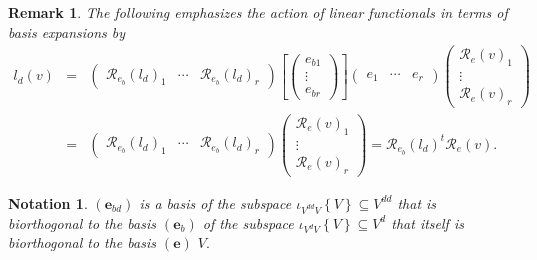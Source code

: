 \documentclass[aps,preprint]{revtex4}
\newtheorem{notation}[theorem]{Notation}
\newtheorem{remark}[theorem]{Remark}
\begin{document}
\begin{remark}
The following emphasizes the action of linear functionals in terms of basis
expansions by 
\begin{eqnarray}
l_{d}\left( v\right) &=&\left( 
\begin{array}{ccc}
\mathcal{R}_{e_{b}}\left( l_{d}\right) _{1} & \cdots & \mathcal{R}%
_{e_{b}}\left( l_{d}\right) _{r}%
\end{array}%
\right) \left[ \left( 
\begin{array}{c}
e_{b1} \\ 
\vdots \\ 
e_{br}%
\end{array}%
\right) \right] \left( 
\begin{array}{ccc}
e_{1} & \cdots & e_{r}%
\end{array}%
\right) \left( 
\begin{array}{c}
\mathcal{R}_{e}\left( v\right) _{1} \\ 
\vdots \\ 
\mathcal{R}_{e}\left( v\right) _{r}%
\end{array}%
\right) \\
&=&\left( 
\begin{array}{ccc}
\mathcal{R}_{e_{b}}\left( l_{d}\right) _{1} & \cdots & \mathcal{R}%
_{e_{b}}\left( l_{d}\right) _{r}%
\end{array}%
\right) \left( 
\begin{array}{c}
\mathcal{R}_{e}\left( v\right) _{1} \\ 
\vdots \\ 
\mathcal{R}_{e}\left( v\right) _{r}%
\end{array}%
\right) =\mathcal{R}_{e_{b}}\left( l_{d}\right) ^{t}\mathcal{R}_{e}\left(
v\right) .
\end{eqnarray}
\end{remark}

\begin{notation}
$\left( \boldsymbol{e}_{bd}\right) $ is a basis of the subspace $\iota
_{V^{dd}V}\left\{ V\right\} \subseteq V^{dd}$ that is biorthogonal to the
basis $\left( \boldsymbol{e}_{b}\right) $ of the subspace $\iota
_{V^{d}V}\left\{ V\right\} \subseteq V^{d}$ that itself is biorthogonal to
the basis $\left( \boldsymbol{e}\right) $ $V.$
\end{notation}
\end{document}

